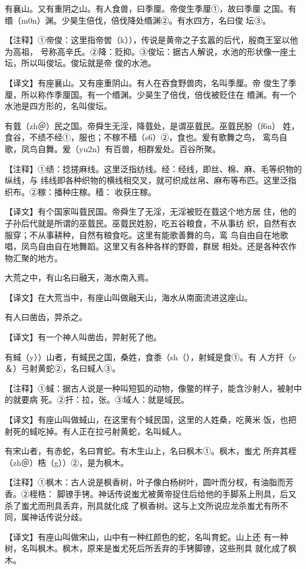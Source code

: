 \documentclass[a4paper,12pt,UTF8,twoside]{ctexbook}
\begin{document}
有襄山。又有重阴之山。有人食兽，曰季厘。帝俊生季厘①，故曰季厘 之国。有缗（m0n）渊。少昊生倍伐，倍伐降处缗渊②。有水四方，名曰俊 坛③。

【注释】①帝俊：这里指帝喾（k）），传说是黄帝之子玄嚣的后代，殷商王室以他为高祖， 号称高辛氏。②降：贬抑。③俊坛：据古人解说，水池的形状像一座土坛，所以叫俊坛。俊坛就是帝 俊的水池。

【译文】有座襄山。又有座重阴山。有人在吞食野兽肉，名叫季厘。帝 俊生了季厘，所以称作季厘国。有一个缗渊。少昊生了倍伐，倍伐被贬住在 缗渊。有一个水池是四方形的，名叫俊坛。

有臷（zh＠）民之国。帝舜生无淫，降臷处，是谓巫臷民。巫臷民朌（f6n） 姓，食谷，不绩不经①，服也；不稼不穑（s6）②，食也。爰有歌舞之鸟， 鸾鸟自歌，凤鸟自舞。爰（yu2n）有百兽，相群爰处。百谷所聚。

【注释】①绩：捻搓麻线。这里泛指纺线。经：经线，即丝、棉、麻、毛等织物的纵线，与 纬线即各种织物的横线相交叉，就可织成丝帛、麻布等布匹。这里泛指织布。②稼：播种庄稼。穑： 收获庄稼。

【译文】有个国家叫臷民国。帝舜生了无淫，无淫被贬在臷这个地方居 住，他的子孙后代就是所谓的巫臷民。巫臷民姓朌，吃五谷粮食，不从事纺 织，自然有衣服穿；不从事耕种，自然有粮食吃。这里有能歌善舞的鸟，鸾 鸟自由自在地歌唱，凤鸟自由自在地舞蹈。这里又有各种各样的野兽，群居 相处。还是各种农作物汇聚的地方。

大荒之中，有山名曰融天，海水南入焉。

【译文】在大荒当中，有座山叫做融天山，海水从南面流进这座山。

有人曰凿齿，羿杀之。

【译文】有一个神人叫凿齿，羿射死了他。

有蜮（y））山者，有蜮民之国，桑姓，食黍（sh（），射蜮是食①。有 人方扞（y＆）弓射黄蛇②，名曰蜮人③。

【注释】①蜮：据古人说是一种叫短狐的动物，像鳖的样子，能含沙射人，被射中的就要病 死。②扞：拉，张。③域人：就是域民。

【译文】有座山叫做蜮山，在这里有个蜮民国，这里的人姓桑，吃黄米 饭，也把射死的蜮吃掉。有人正在拉弓射黄蛇，名叫蜮人。

有宋山者，有赤蛇，名曰育蛇。有木生山上，名曰枫木①。枫木，蚩尤 所弃其桎（zh＠）梏（g））②，是为枫木。

【注释】①枫木：古人说是枫香树，叶子像白杨树叶，圆叶而分杈，有油脂而芳香。②桎梏： 脚镣手铐。神话传说蚩尤被黄帝捉住后给他的手脚系上刑具，后又杀了蚩尤而刑具丢弃，刑具就化成 了枫香树。这与上文所说应龙杀蚩尤有所不同，属神话传说分歧。

【译文】有座山叫做宋山，山中有一种红颜色的蛇，名叫育蛇。山上还 有一种树，名叫枫木。枫木，原来是蚩尤死后所丢弃的手铐脚镣，这些刑具 就化成了枫木。
\end{document}
